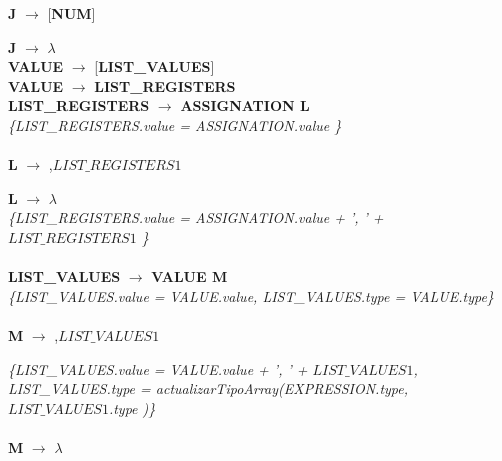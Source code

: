 \documentclass[10pt,a4paper]{article}
\begin{document}
\textbf{J} $\rightarrow$ [\textbf{NUM}] 

\textbf{J} $\rightarrow$ $\lambda$   \\


\textbf{VALUE} $\rightarrow$ [\textbf{LIST\_VALUES}]   \\


\textbf{VALUE} $\rightarrow$ \textbf{LIST\_REGISTERS} \\




\textbf{LIST\_REGISTERS} $\rightarrow$ \textbf{ASSIGNATION L} \\

\textit{\{LIST\_REGISTERS.value =  ASSIGNATION.value \}}  \\ \\

\textbf{L} $\rightarrow$ ,\textbf{$LIST\_REGISTERS{1}$} 

\textbf{L} $\rightarrow$ $\lambda$\\

\textit{\{LIST\_REGISTERS.value =  ASSIGNATION.value + ', ' + $LIST\_REGISTERS{1}$ \}}  \\ \\



\textbf{LIST\_VALUES} $\rightarrow$ \textbf{VALUE M} \\

\textit{\{LIST\_VALUES.value =  VALUE.value, LIST\_VALUES.type = VALUE.type\}}  \\ \\

\textbf{M} $\rightarrow$ ,\textbf{$LIST\_VALUES{1}$}

\textit{\{LIST\_VALUES.value =  VALUE.value + ', ' + $LIST\_VALUES{1}$, LIST\_VALUES.type = actualizarTipoArray(EXPRESSION.type, $LIST\_VALUES{1}$.type )\}}  \\ \\

\textbf{M} $\rightarrow$ $\lambda$ \\
\end{document}
